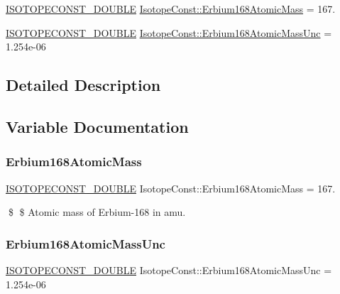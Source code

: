 \begin{DoxyCompactItemize}
\item 
\mbox{\hyperlink{group___isotope_const-_macros_ga8f45a7272ce02c0b4c65c44636ed719a}{I\+S\+O\+T\+O\+P\+E\+C\+O\+N\+S\+T\+\_\+\+D\+O\+U\+B\+LE}} \mbox{\hyperlink{group___isotope_const-_erbium-_er168_ga3d9d42364a1d026e825adc014ca331e3}{Isotope\+Const\+::\+Erbium168\+Atomic\+Mass}} = 167.
\item 
\mbox{\hyperlink{group___isotope_const-_macros_ga8f45a7272ce02c0b4c65c44636ed719a}{I\+S\+O\+T\+O\+P\+E\+C\+O\+N\+S\+T\+\_\+\+D\+O\+U\+B\+LE}} \mbox{\hyperlink{group___isotope_const-_erbium-_er168_ga9490b5cba729fdf51f51ea6ad154bf74}{Isotope\+Const\+::\+Erbium168\+Atomic\+Mass\+Unc}} = 1.\+254e-\/06
\end{DoxyCompactItemize}


\subsection{Detailed Description}


\subsection{Variable Documentation}
\mbox{\label{group___isotope_const-_erbium-_er168_ga3d9d42364a1d026e825adc014ca331e3}} 
\subsubsection{\texorpdfstring{Erbium168\+Atomic\+Mass}{Erbium168AtomicMass}}
{\footnotesize\ttfamily \mbox{\hyperlink{group___isotope_const-_macros_ga8f45a7272ce02c0b4c65c44636ed719a}{I\+S\+O\+T\+O\+P\+E\+C\+O\+N\+S\+T\+\_\+\+D\+O\+U\+B\+LE}} Isotope\+Const\+::\+Erbium168\+Atomic\+Mass = 167.}

\$ \$ Atomic mass of Erbium-\/168 in amu. \mbox{\label{group___isotope_const-_erbium-_er168_ga9490b5cba729fdf51f51ea6ad154bf74}} 
\subsubsection{\texorpdfstring{Erbium168\+Atomic\+Mass\+Unc}{Erbium168AtomicMassUnc}}
{\footnotesize\ttfamily \mbox{\hyperlink{group___isotope_const-_macros_ga8f45a7272ce02c0b4c65c44636ed719a}{I\+S\+O\+T\+O\+P\+E\+C\+O\+N\+S\+T\+\_\+\+D\+O\+U\+B\+LE}} Isotope\+Const\+::\+Erbium168\+Atomic\+Mass\+Unc = 1.\+254e-\/06}

